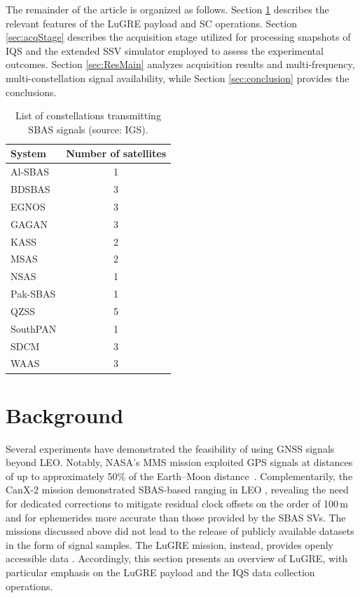 \documentclass{IEEEtaes}
\begin{document}
The remainder of the article is organized as follows. Section \ref{sec:Background} describes the relevant features of the LuGRE payload and \gls{SC} operations. Section \ref{sec:acqStage} describes the acquisition stage utilized for processing snapshots of \gls{IQS} and the extended \gls{SSV} simulator employed to assess the experimental outcomes. Section \ref{sec:ResMain} analyzes acquisition results and multi-frequency, multi-constellation signal availability, while Section \ref{sec:conclusion} provides the conclusions.

\begin{table}[t]
\centering
\caption{List of constellations transmitting \gls{SBAS} signals (source: \gls{IGS}).}
\label{tab:SBASlist}
\begin{tabular}{lc}
\toprule
\textbf{System} & \textbf{Number of satellites} \\
\midrule
Al-SBAS  & 1 \\
BDSBAS   & 3 \\
EGNOS    & 3 \\
GAGAN    & 3 \\
KASS     & 2 \\
MSAS     & 2 \\
NSAS     & 1 \\
Pak-SBAS & 1 \\
QZSS     & 5 \\
SouthPAN & 1 \\
SDCM     & 3 \\
WAAS     & 3 \\
\bottomrule
\end{tabular}
\end{table}

\section{Background}
\label{sec:Background}

Several experiments have demonstrated the feasibility of using \gls{GNSS} signals beyond \gls{LEO}. Notably, \gls{NASA}'s \gls{MMS} mission exploited \gls{GPS} signals at distances of up to approximately 50\% of the Earth–Moon distance~\cite{mms2016navi,winternitz2017new,mmsRecordNews}. Complementarily, the \gls{CanX-2} mission demonstrated \gls{SBAS}-based ranging in \gls{LEO} \cite{kahr2016analysis, sarda2010canadian}, revealing the need for dedicated corrections to mitigate residual clock offsets on the order of 100\,m and for ephemerides more accurate than those provided by the \gls{SBAS} \glspl{SV}.
The missions discussed above did not lead to the release of publicly available datasets in the form of signal samples. The \gls{LuGRE} mission, instead, provides openly accessible data \cite{parker2025lunar}. Accordingly, this section presents an overview of \gls{LuGRE}, with particular emphasis on the \gls{LuGRE} payload and the \gls{IQS} data collection operations.
\end{document}

